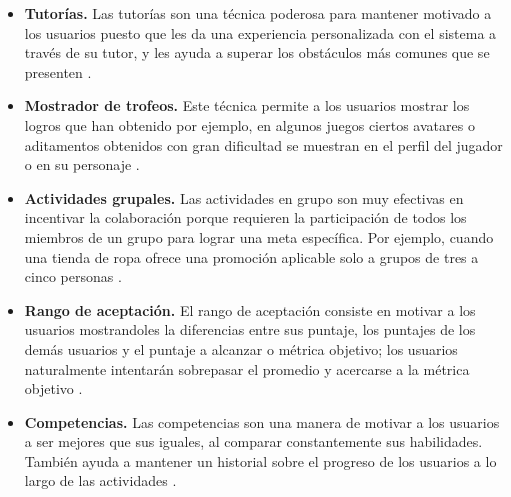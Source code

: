     \begin{itemize}

    \item
    {\bf Tutorías.}
        Las tutorías son una técnica poderosa para mantener motivado a los usuarios
        puesto que les da una experiencia personalizada con el sistema a través de su
        tutor, y les ayuda a superar los obstáculos más comunes que se presenten
        \cite[p. 215]{Octalysis}.

    \item
    {\bf Mostrador de trofeos.}
        Este técnica permite a los usuarios mostrar los logros que han obtenido
        por ejemplo, en algunos juegos ciertos avatares o aditamentos obtenidos con
        gran dificultad se muestran en el perfil del jugador o en su personaje
        \cite[p. 218]{Octalysis}.

    \item
    {\bf Actividades grupales.}
        Las actividades en grupo son muy efectivas en incentivar la colaboración
        porque requieren la participación de todos los miembros de un grupo para
        lograr una meta específica. Por ejemplo, cuando una tienda de ropa ofrece
        una promoción aplicable solo a grupos de tres a cinco personas
        \cite[p. 221]{Octalysis}.

    \item
    {\bf Rango de aceptación.} %
        El rango de aceptación consiste en motivar a los usuarios mostrandoles
        la diferencias entre sus puntaje, los puntajes de los demás usuarios 
        y el puntaje a alcanzar o métrica objetivo; los usuarios naturalmente
        intentarán sobrepasar el promedio y acercarse a la métrica objetivo
        \cite[p. 226]{Octalysis}.

    \item
    {\bf Competencias.}
        Las competencias son una manera de motivar a los usuarios a ser mejores
        que sus iguales, al comparar constantemente sus habilidades. También ayuda
        a mantener un historial sobre el progreso de los usuarios a lo largo de las
        actividades \cite[p. 210]{Octalysis}.


    \end{itemize}

